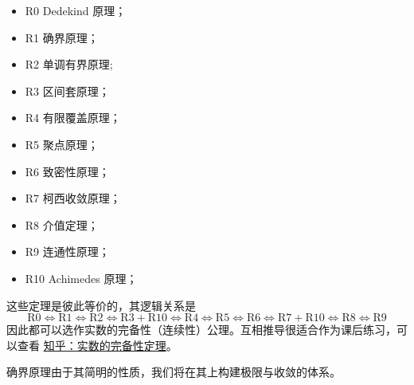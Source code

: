 \begin{itemize}
	\item R0 Dedekind 原理；
	\item R1 确界原理；
	\item R2 单调有界原理;
	\item R3 区间套原理；
	\item R4 有限覆盖原理；
	\item R5 聚点原理；
	\item R6 致密性原理；
	\item R7 柯西收敛原理；
	\item R8 介值定理；
	\item R9 连通性原理；
	\item R10 Achimedes 原理；
\end{itemize}

这些定理是彼此等价的，其逻辑关系是
\[ \mathrm{R0} \Leftrightarrow \mathrm{R1} \Leftrightarrow\mathrm{R2} \Leftrightarrow\mathrm{R3} + \mathrm{R10} \Leftrightarrow\mathrm{R4} \Leftrightarrow\mathrm{R5} \Leftrightarrow\mathrm{R6} \Leftrightarrow\mathrm{R7}+\mathrm{R10} \Leftrightarrow\mathrm{R8} \Leftrightarrow\text{R9}  \]
因此都可以选作实数的完备性（连续性）公理。互相推导很适合作为课后练习，可以查看 \href{https://zhuanlan.zhihu.com/p/48859870}{知乎：实数的完备性定理}。

确界原理由于其简明的性质，我们将在其上构建极限与收敛的体系。







